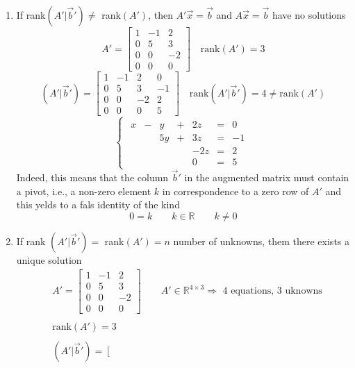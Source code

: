 \begin{enumerate}
    \item If rank$\left(A' | \vec b' \right) \ne$ rank$\left( A' \right)$, then $A'\vec x=\vec b$ and $A \vec x = \vec b$ have no solutions
    $$A' = \begin{bmatrix}
        1 &-1 &2\\
        0 &5 &3\\
        0 &0 &-2\\
        0 & 0 &0
    \end{bmatrix} \quad \text{rank}(A') = 3$$
    $$\left(A' | \vec b'\right) = \left[
\begin{array}{ccc|c}
1 & -1 & 2 &0\\
0 & 5 & 3 & -1\\
0 & 0 & -2 & 2\\
0 & 0 & 0 &5
\end{array}
\right] \quad \text{rank}\left(A' | \vec b'\right) = 4 \ne \text{rank}(A')$$
$$\begin{cases}
\begin{alignedat}{4}
x &{}-{}& y &{}+{}& 2z &{}={}& 0\\
  &      & 5y&{}+{}& 3z &{}={}& -1\\
  &      &   &      &-2z &{}={}& 2\\
  &      &   &      & 0  &{}={}& 5
\end{alignedat}
\end{cases}$$
Indeed, this means that the column $\vec b'$ in the augmented matrix must contain a pivot, i.e., a non-zero element $k$ in correspondence to a zero row of $A'$ and this yelds to a fals identity of the kind 
$$0 = k \qquad k\in \mathbb{R} \qquad k \ne 0$$
\item If rank $\left( A'|\vec b' \right) =$ rank$(A') = n$ number of unknowns, them there exists a unique solution 
\begin{align*}
    &A' = \begin{bmatrix}
        1 &-1 &2\\
        0 &5 &3\\
        0 &0 &-2\\
        0 & 0 &0
    \end{bmatrix} \qquad A' \in \mathbb{R}^{4 \times 3} \Rightarrow \text{ 4 equations, 3 uknowns} \\
    &\\
    &\text{rank}(A') = 3 \\
    &\\
    &\left(A'|\vec b' \right) = \left[
\begin{array}{ccc|c}

\end{array}
\end{align*}
\end{enumerate}
